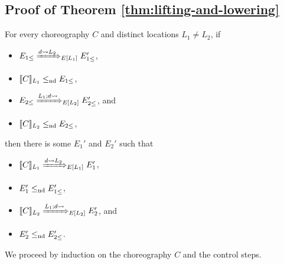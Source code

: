 \subsection{Proof of Theorem \ref{thm:lifting-and-lowering}}
\begin{lem}
\label{lem:choice-control-lowering}
For every choreography $C$ and distinct locations $L_1 \neq L_2$, if
\begin{itemize}
  \item $E_{1 \leq} \ctrlsteploc[d \sendsto L_2]{L_1} E_{1 \leq}'$,
  \item $\llbracket C\rrbracket_{L_1} \leq_{\text{nd}} E_{1 \leq}$,
  \item $E_{2 \leq} \ctrlsteploc[L_1;d \sendsto]{L_2} E_{2 \leq}'$, and
  \item $\llbracket C\rrbracket_{L_2} \leq_{\text{nd}} E_{2 \leq}$,
\end{itemize}
then there is some $E_1'$ and $E_2'$ such that
\begin{itemize}
  \item $\epp{C}{L_1} \ctrlsteploc[d \sendsto L_2]{L_1} E_1'$,
  \item $E_1' \leq_{\text{nd}} E_{1 \leq}'$,
  \item $\epp{C}{L_2} \ctrlsteploc[L_1;d \sendsto]{L_2} E_2'$, and
  \item $E_2' \leq_{\text{nd}} E_{2 \leq}'$.
\end{itemize}
\end{lem}
We proceed by induction on the choreography $C$ and the control steps.
